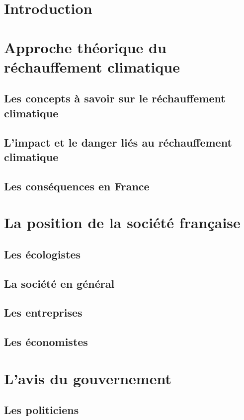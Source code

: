 \documentclass[a4paper,11pt]{article}
\begin{document}
\titleTMB 
\newpage
\tableofcontents
\newpage

\section*{Introduction}

\section{Approche théorique du réchauffement climatique}
\subsection{ Les concepts à savoir sur le réchauffement climatique}
\subsection{L’impact et le danger liés au réchauffement climatique}
\subsection{Les conséquences en France}


\section{La position de la société française}
\subsection{Les écologistes}
\subsection{La société en général} 
\subsection{Les entreprises}
\subsection{Les économistes} 


\section{L’avis du gouvernement}
\subsection{Les politiciens}
\end{document}

